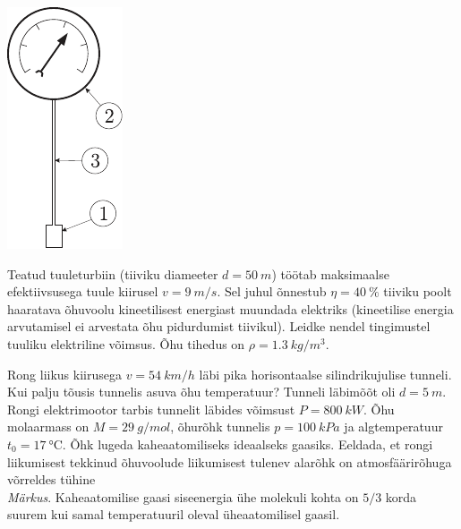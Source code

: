 \documentclass[10pt, twoside]{article}
\begin{document}
{\begin{center}
	\includegraphics[width=0.25\linewidth]{2006-v2g-05-yl}
\end{center}
\probend
\bigskip


Teatud tuuleturbiin (tiiviku diameeter $d = \SI{50}{m}$) töötab maksimaalse efektiivsusega tuule kiirusel $v = \SI{9}{m/s}$. Sel juhul õnnestub $\eta = \SI{40}{\%}$ tiiviku poolt haaratava õhuvoolu kineetilisest energiast muundada elektriks (kineetilise energia arvutamisel ei arvestata õhu pidurdumist tiivikul). Leidke nendel tingimustel tuuliku elektriline võimsus. Õhu tihedus on $\rho = \SI{1,3}{kg/m^3}$.
\probend
\bigskip


Rong liikus kiirusega $v=\SI{54}{km/h}$ läbi pika horisontaalse silindrikujulise tunneli.
Kui palju tõusis tunnelis asuva õhu temperatuur? Tunneli läbimõõt oli $d=\SI{5}{m}$.
Rongi elektrimootor tarbis tunnelit läbides võimsust $P=\SI{800}{kW}$.
Õhu molaarmass on $M=\SI{29}{g/mol}$, õhurõhk tunnelis $p=\SI{100}{kPa}$ ja algtemperatuur $t_0=\SI{17}{\degreeCelsius}$.
Õhk lugeda kaheaatomiliseks ideaalseks gaasiks. Eeldada, et rongi liikumisest tekkinud õhuvoolude liikumisest tulenev alarõhk on atmosfäärirõhuga võrreldes tühine\\
\emph{Märkus}. Kaheaatomilise gaasi siseenergia ühe molekuli kohta on $5/3$ korda suurem kui samal temperatuuril oleval üheaatomilisel gaasil.
\probend
\bigskip


}
\end{document}
